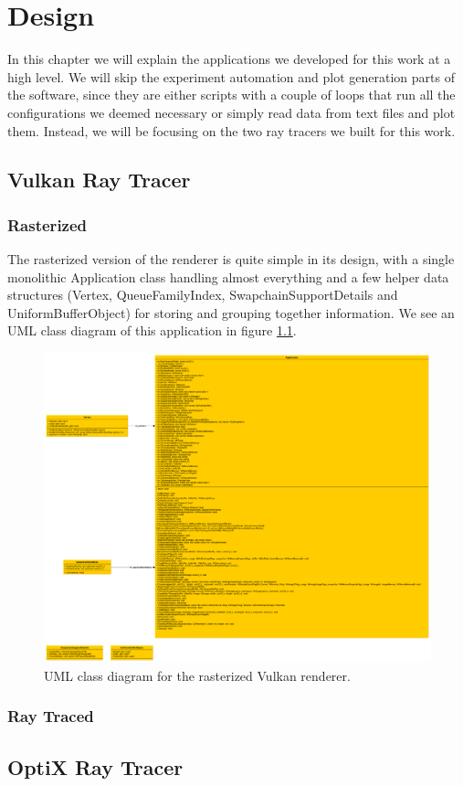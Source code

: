 \chapter{Design}
In this chapter we will explain the applications we developed for this work at a high level. We will skip the experiment automation and plot generation parts of the software, since they are either scripts with a couple of loops that run all the configurations we deemed necessary or simply read data from text files and plot them. Instead, we will be focusing on the two ray tracers we built for this work.

\section{Vulkan Ray Tracer}
\subsection{Rasterized}
The rasterized version of the renderer is quite simple in its design, with a single monolithic Application class handling almost everything and a few helper data structures (Vertex, QueueFamilyIndex, SwapchainSupportDetails and UniformBufferObject) for storing and grouping together information. We see an UML class diagram of this application in figure \ref{rasterized-uml}.

\begin{figure}[hbt!]
  \centering
  \includegraphics[width=\textwidth]{figuras/rasterized-uml.png}
  \caption{UML class diagram for the rasterized Vulkan renderer.}
  \label{rasterized-uml}
\end{figure}
\subsection{Ray Traced}
\section{OptiX Ray Tracer}
